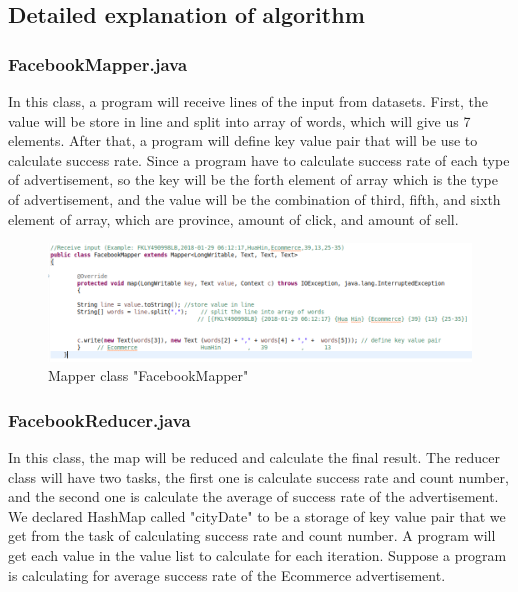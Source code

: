 \documentclass[11pt]{article}
\begin{document}
\subsection{Detailed explanation of algorithm}
\subsubsection{FacebookMapper.java}
In this class, a program will receive lines of the input from datasets. First, the value will be store in line and split into array of words, which will give us 7 elements. After that, a program will define key value pair that will be use to calculate success rate. Since a program have to calculate success rate of each type of advertisement, so the key will be the forth element of array which is the type of advertisement, and the value will be the combination of third, fifth, and sixth element of array, which are province, amount of click, and amount of sell.\\
[0.5 cm] 

\begin{figure}[h]
\centering
\includegraphics[scale=0.65]{code2}
\caption{Mapper class "FacebookMapper"}
\end{figure}

\newpage


\subsubsection{FacebookReducer.java}
In this class, the map will be reduced and calculate the final result. The reducer class will have two tasks, the first one is calculate success rate and count number, and the second one is calculate the average of success rate of the advertisement. We declared HashMap called "cityDate" to be a storage of key value pair that we get from the task of calculating success rate and count number. A program will get each value in the value list to calculate for each iteration. Suppose a program is calculating for average success rate of the Ecommerce advertisement. \\
[0.5 cm]
\end{document}
